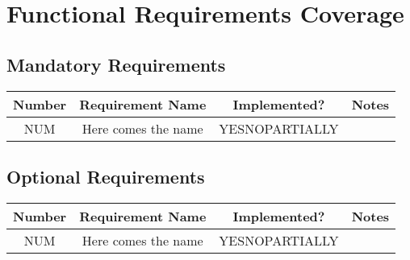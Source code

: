 \section{Functional Requirements Coverage}
\subsection{Mandatory Requirements}
\begin{center}
    \begin{tabular}{c||c|c|c} 
        Number & Requirement Name & Implemented? & Notes \\ [0.5ex]
        \hline
        NUM & Here comes the name & YESNOPARTIALLY &  \\ 
        [1ex] 
   \end{tabular}
\end{center}

\subsection{Optional Requirements}
\begin{center}
    \begin{tabular}{c||c|c|c} 
        Number & Requirement Name & Implemented? & Notes \\ [0.5ex]
        \hline
        NUM & Here comes the name & YESNOPARTIALLY &  \\ 
        [1ex] 
   \end{tabular}
\end{center}